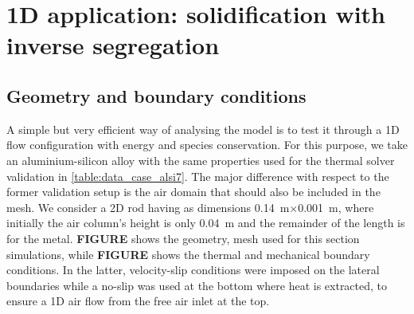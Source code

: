 
\cleardoublepage
\section{1D application: solidification with inverse segregation}
\subsection{Geometry and boundary conditions}
A simple but very efficient way of analysing the model is to test it through a 1D flow configuration with energy and species conservation.
For this purpose, we take an aluminium-silicon alloy with the same properties used for the thermal solver validation in \cref{table:data_case_alsi7}.
The major difference with respect to the former validation setup is the air domain that should also be included in the mesh.
We consider a 2D rod having as dimensions \SI{0.14}{\metre}$\times$\SI{0.001}{m}, where initially the air column's height is only \SI{0.04}{\metre}
and the remainder of the length is for the metal.  
\textbf{FIGURE} shows the geometry, mesh used for this section simulations, while \textbf{FIGURE} shows the thermal and mechanical boundary conditions.
In the latter, velocity-slip conditions were imposed on the lateral boundaries while a no-slip was used at the bottom where heat is extracted,
to ensure a 1D air flow from the free air inlet at the top. 

